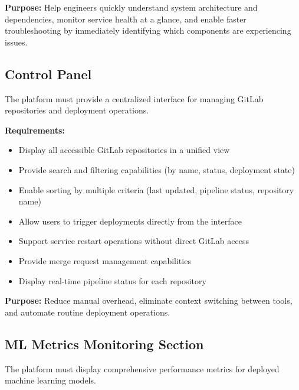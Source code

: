 \textbf{Purpose:} Help engineers quickly understand system architecture and dependencies, monitor service health at a glance, and enable faster troubleshooting by immediately identifying which components are experiencing issues.

\subsection{Control Panel}

The platform must provide a centralized interface for managing GitLab repositories and deployment operations.

\textbf{Requirements:}
\begin{itemize}
    \item Display all accessible GitLab repositories in a unified view
    \item Provide search and filtering capabilities (by name, status, deployment state)
    \item Enable sorting by multiple criteria (last updated, pipeline status, repository name)
    \item Allow users to trigger deployments directly from the interface
    \item Support service restart operations without direct GitLab access
    \item Provide merge request management capabilities
    \item Display real-time pipeline status for each repository
\end{itemize}

\textbf{Purpose:} Reduce manual overhead, eliminate context switching between tools, and automate routine deployment operations.

\subsection{ML Metrics Monitoring Section}

The platform must display comprehensive performance metrics for deployed machine learning models.

